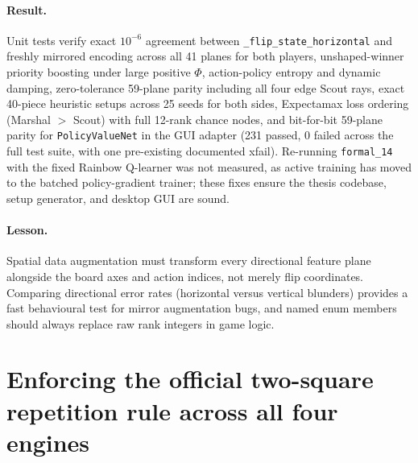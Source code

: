 \paragraph{Result.} Unit tests verify exact $10^{-6}$ agreement between
\texttt{\_flip\_state\_horizontal} and freshly mirrored encoding across all 41 planes for both
players, unshaped-winner priority boosting under large positive $\Phi$, action-policy entropy and
dynamic damping, zero-tolerance 59-plane parity including all four edge Scout rays, exact 40-piece
heuristic setups across 25 seeds for both sides, Expectamax loss ordering (Marshal $>$ Scout) with
full 12-rank chance nodes, and bit-for-bit 59-plane parity for \texttt{PolicyValueNet} in the GUI
adapter (231 passed, 0 failed across the full test suite, with one pre-existing documented xfail).
Re-running \texttt{formal\_14} with the fixed Rainbow Q-learner was not measured, as active
training has moved to the batched policy-gradient trainer; these fixes ensure the thesis codebase,
setup generator, and desktop GUI are sound.

\paragraph{Lesson.} Spatial data augmentation must transform every directional feature plane
alongside the board axes and action indices, not merely flip coordinates. Comparing directional
error rates (horizontal versus vertical blunders) provides a fast behavioural test for mirror
augmentation bugs, and named enum members should always replace raw rank integers in game logic.

\section{Enforcing the official two-square repetition rule across all four engines}
\label{sec:two-square}

